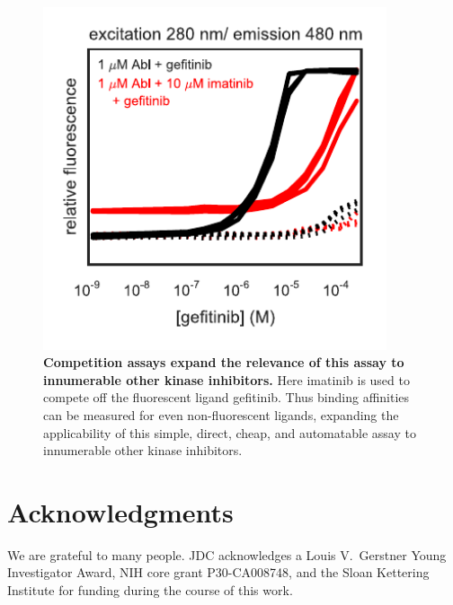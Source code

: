 \documentclass[aps,pre,twocolumn,nofootinbib,superscriptaddress,linenumbers,11point]{revtex4-1}
\begin{document}
\begin{figure}[tbp]
\includegraphics[width=0.9\textwidth]{Abl_Gef_Ima_grant.pdf}
\caption{\label{figure:example} {\bf Competition assays expand the relevance of this assay to innumerable other kinase inhibitors.}
Here imatinib is used to compete off the fluorescent ligand gefitinib. Thus binding affinities can be measured for even non-fluorescent ligands, expanding the applicability of this simple, direct, cheap, and automatable assay to innumerable other kinase inhibitors.
}
\end{figure}


\section*{Acknowledgments}

We are grateful to many people.
JDC acknowledges a Louis V.~Gerstner Young Investigator Award, NIH core grant P30-CA008748, and the Sloan Kettering Institute for funding during the course of this work.


 

\end{document}

